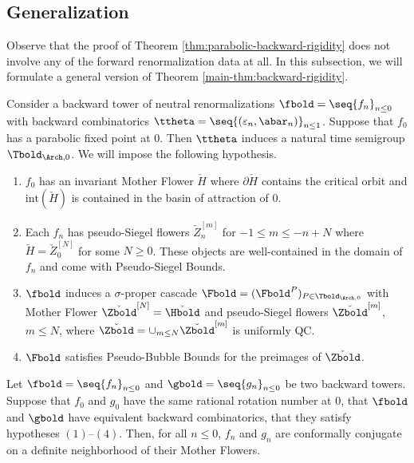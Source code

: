 \documentclass{amsart}
\begin{document}
\subsection{Generalization}

Observe that the proof of Theorem \ref{thm:parabolic-backward-rigidity} does not involve any of the forward renormalization data at all.
In this subsection, we will formulate a general version of Theorem \ref{main-thm:backward-rigidity}.

Consider a backward tower of neutral renormalizations $\fbold = \seq{ f_n }_{n\leq 0}$ with backward combinatorics $\ttheta = \seq{ (\varepsilon_n, \abar_n) }_{n\leq 1}$.
Suppose that $f_0$ has a parabolic fixed point at $0$.
Then $\ttheta$ induces a natural time semigroup $\Tbold_{\Arch,0}$.
We will impose the following hypothesis.
\begin{enumerate}
    \item $f_0$ has an invariant Mother Flower $\check{H}$ where $\partial \check{H}$ contains the critical orbit and $\text{int} (\check{H})$ is contained in the basin of attraction of $0$.
    \item Each $f_n$ has pseudo-Siegel flowers $\check{Z}_n^{[m]}$ for $-1 \leq m \leq -n + N$ where $\check{H} = \check{Z}_0^{[N]}$ for some $N \geq 0$. 
    These objects are well-contained in the domain of $f_n$ and come with Pseudo-Siegel Bounds.
    \item $\fbold$ induces a $\sigma$-proper cascade $\Fbold = (\Fbold^P)_{P \in \Tbold_{\Arch,0}}$ with Mother Flower $\check{\Zbold}^{[N]} = \check{\Hbold}$ and pseudo-Siegel flowers $\check{\Zbold}^{[m]}$, $m \leq N$, where $\check{\Zbold} = \cup_{m\leq N} \check{\Zbold}^{[m]}$ is uniformly QC.
    \item $\Fbold$ satisfies Pseudo-Bubble Bounds for the preimages of $\check{\Zbold}$.
\end{enumerate}

\begin{theorem}
\label{thm:backward-rigidity-general}
    Let $\fbold = \seq{ f_n }_{n\leq 0}$ and $\gbold = \seq{ g_n }_{n\leq 0}$ be two backward towers. 
    Suppose that $f_0$ and $g_0$ have the same rational rotation number at $0$, that $\fbold$ and $\gbold$ have equivalent backward combinatorics, that they satisfy hypotheses $(1)$--$(4)$.
    Then, for all $n \leq 0$, $f_n$ and $g_n$ are conformally conjugate on a definite neighborhood of their Mother Flowers.
\end{theorem}
\end{document}
